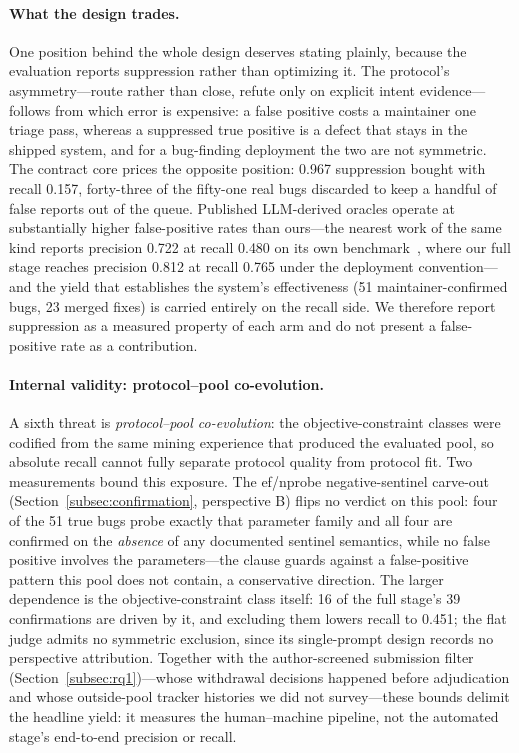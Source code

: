 \documentclass[acmsmall,screen,review,anonymous]{acmart}
\begin{document}
\paragraph{What the design trades.}
One position behind the whole design deserves stating plainly, because the evaluation reports suppression rather than optimizing it. The protocol's asymmetry---route rather than close, refute only on explicit intent evidence---follows from which error is expensive: a false positive costs a maintainer one triage pass, whereas a suppressed true positive is a defect that stays in the shipped system, and for a bug-finding deployment the two are not symmetric. The contract core prices the opposite position: 0.967 suppression bought with recall 0.157, forty-three of the fifty-one real bugs discarded to keep a handful of false reports out of the queue. Published LLM-derived oracles operate at substantially higher false-positive rates than ours---the nearest work of the same kind reports precision 0.722 at recall 0.480 on its own benchmark~\cite{metamon25}, where our full stage reaches precision 0.812 at recall 0.765 under the deployment convention---and the yield that establishes the system's effectiveness (51 maintainer-confirmed bugs, 23 merged fixes) is carried entirely on the recall side. We therefore report suppression as a measured property of each arm and do not present a false-positive rate as a contribution.

\paragraph{Internal validity: protocol--pool co-evolution.}
A sixth threat is \emph{protocol--pool co-evolution}: the objective-constraint classes were codified from the same mining experience that produced the evaluated pool, so absolute recall cannot fully separate protocol quality from protocol fit. Two measurements bound this exposure. The ef/nprobe negative-sentinel carve-out (Section~\ref{subsec:confirmation}, perspective B) flips no verdict on this pool: four of the 51 true bugs probe exactly that parameter family and all four are confirmed on the \emph{absence} of any documented sentinel semantics, while no false positive involves the parameters---the clause guards against a false-positive pattern this pool does not contain, a conservative direction. The larger dependence is the objective-constraint class itself: 16 of the full stage's 39 confirmations are driven by it, and excluding them lowers recall to 0.451; the flat judge admits no symmetric exclusion, since its single-prompt design records no perspective attribution. Together with the author-screened submission filter (Section~\ref{subsec:rq1})---whose withdrawal decisions happened before adjudication and whose outside-pool tracker histories we did not survey---these bounds delimit the headline yield: it measures the human--machine pipeline, not the automated stage's end-to-end precision or recall.
\end{document}
